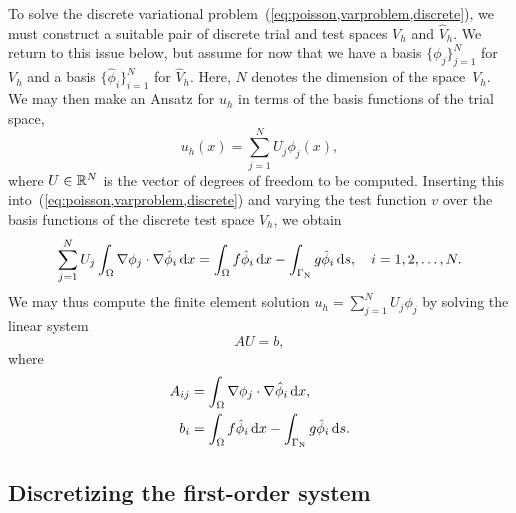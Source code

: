 To solve the discrete variational
problem~(\ref{eq:poisson,varproblem,discrete}), we must construct a
suitable pair of discrete trial and test spaces $V_h$ and $\hat{V}_h$.
We return to this issue below, but assume for now that we have a basis
$\{\phi_j\}_{j=1}^N$ for $V_h$ and a basis $\{\hat{\phi}_i\}_{i=1}^N$
for $\hat{V}_h$. Here, $N$ denotes the dimension of the space~$V_h$.
We may then make an Ansatz for $u_h$ in terms of the basis functions
of the trial space,
%
%
\begin{equation}
  u_h(x) = \sum_{j=1}^N U_j \phi_j(x),
\end{equation}
where $U \in \mathbb{R}^N$ is the vector of degrees of freedom to be computed.
Inserting this into~(\ref{eq:poisson,varproblem,discrete}) and varying
the test function $v$ over the basis functions of the discrete test
space $\hat{V}_h$, we obtain
\begin{equation}
  \sum_{j=1}^N U_j \int_{\Omega} \nabla \phi_j \cdot \nabla \hat{\phi}_i \, \mathrm{d}x =
  \int_{\Omega} f \hat{\phi}_i \, \mathrm{d}x - \int_{\Gamma_{\mathrm{N}}} g \hat{\phi}_i \, \mathrm{d}s,
  \quad i = 1,2,\ldots,N.
\end{equation}
We may thus compute the finite element solution $u_h = \sum_{j=1}^N
U_j \phi_j$ by solving the linear system
\begin{equation}
  AU = b,
\end{equation}
where
\begin{equation}
\begin{split}
  A_{ij} &= \int_{\Omega} \nabla \phi_j \cdot \nabla \hat{\phi}_i \, \mathrm{d}x,
  \\
  b_i &= \int_{\Omega} f \hat{\phi}_i \, \mathrm{d}x - \int_{\Gamma_{\mathrm{N}}} g \hat{\phi}_i \, \mathrm{d}s.
\end{split}
\end{equation}

\subsection{Discretizing the first-order system}
\label{sec:kirby-7:mixed}

